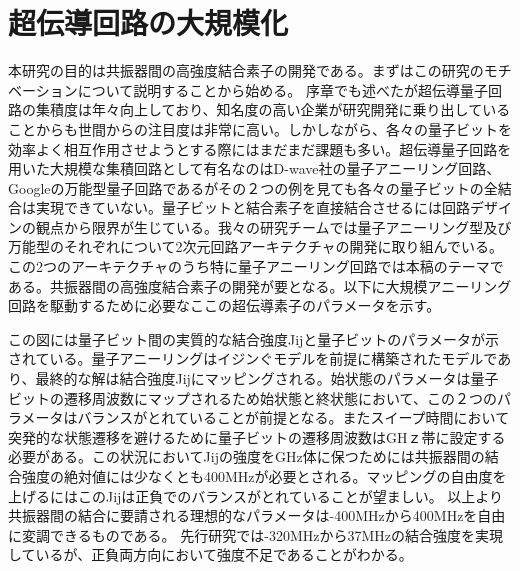 \section{超伝導回路の大規模化}
    本研究の目的は共振器間の高強度結合素子の開発である。まずはこの研究のモチベーションについて説明することから始める。
    序章でも述べたが超伝導量子回路の集積度は年々向上しており、知名度の高い企業が研究開発に乗り出していることからも世間からの注目度は非常に高い。しかしながら、各々の量子ビットを効率よく相互作用させようとする際にはまだまだ課題も多い。超伝導量子回路を用いた大規模な集積回路として有名なのはD-wave社の量子アニーリング回路、Googleの万能型量子回路であるがその２つの例を見ても各々の量子ビットの全結合は実現できていない。量子ビットと結合素子を直接結合させるには回路デザインの観点から限界が生じている。我々の研究チームでは量子アニーリング型及び万能型のそれぞれについて2次元回路アーキテクチャの開発に取り組んでいる。この2つのアーキテクチャのうち特に量子アニーリング回路では本稿のテーマである。共振器間の高強度結合素子の開発が要となる。以下に大規模アニーリング回路を駆動するために必要なここの超伝導素子のパラメータを示す。

    この図には量子ビット間の実質的な結合強度Jijと量子ビットのパラメータが示されている。量子アニーリングはイジンぐモデルを前提に構築されたモデルであり、最終的な解は結合強度Jijにマッピングされる。始状態のパラメータは量子ビットの遷移周波数にマップされるため始状態と終状態において、この２つのパラメータはバランスがとれていることが前提となる。またスイープ時間において突発的な状態遷移を避けるために量子ビットの遷移周波数はGHｚ帯に設定する必要がある。この状況においてJijの強度をGHz体に保つためには共振器間の結合強度の絶対値には少なくとも400MHzが必要とされる。マッピングの自由度を上げるにはこのJijは正負でのバランスがとれていることが望ましい。
    以上より共振器間の結合に要請される理想的なパラメータは-400MHzから400MHzを自由に変調できるものである。
    先行研究\cite*{Wulschner2016}では-320MHzから37MHzの結合強度を実現しているが、正負両方向において強度不足であることがわかる。

\section{}

